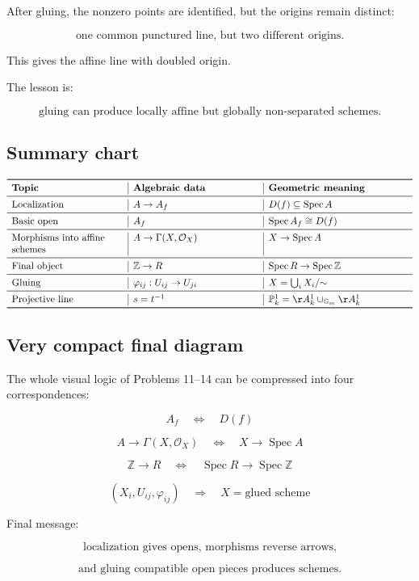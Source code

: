 \documentclass[12pt,a4paper]{article}
\newcommand{\GG}{\mathbb G}
\newcommand{\ZZ}{\mathbb Z}
\newcommand{\PP}{\mathbb P}
\newcommand{\OO}{\mathcal{O}}
\newcommand{\Spec}{\operatorname{Spec}}
\theoremstyle{notespace}
\begin{document}
After gluing, the nonzero points are identified, but the origins remain distinct:

\[
\boxed{
	\text{one common punctured line, but two different origins.}
}
\]

This gives the affine line with doubled origin.

The lesson is:

\[
\boxed{
	\text{gluing can produce locally affine but globally non-separated schemes.}
}
\]

\subsection{Summary chart}

\[
\begin{array}{>{\raggedright\arraybackslash}p{4cm}
		|>{\raggedright\arraybackslash}p{4.5cm}
		|>{\raggedright\arraybackslash}p{5cm}}
	\toprule
	\textbf{Topic}
	&
	\textbf{Algebraic data}
	&
	\textbf{Geometric meaning}
	\\
	\midrule
	Localization
	&
	\(A\to A_f\)
	&
	\(D(f)\subseteq\Spec A\)
	\\
	\midrule
	Basic open
	&
	\(A_f\)
	&
	\(\Spec A_f\cong D(f)\)
	\\
	\midrule
	Morphisms into affine schemes
	&
	\(A\to\Gamma(X,\OO_X)\)
	&
	\(X\to\Spec A\)
	\\
	\midrule
	Final object
	&
	\(\ZZ\to R\)
	&
	\(\Spec R\to\Spec\ZZ\)
	\\
	\midrule
	Gluing
	&
	\(\varphi_{ij}:U_{ij}\to U_{ji}\)
	&
	\(X=\bigcup_i X_i/{\sim}\)
	\\
	\midrule
	Projective line
	&
	\(s=t^{-1}\)
	&
	\(\PP^1_k=\AA^1_k\cup_{\GG_m}\AA^1_k\)
	\\
	\bottomrule
\end{array}
\]

\subsection{Very compact final diagram}

The whole visual logic of Problems 11--14 can be compressed into four correspondences:

\[
\boxed{
	A_f
}
\quad
\Longleftrightarrow
\quad
\boxed{
	D(f)
}
\]

\[
\boxed{
	A\to\Gamma(X,\OO_X)
}
\quad
\Longleftrightarrow
\quad
\boxed{
	X\to\Spec A
}
\]

\[
\boxed{
	\ZZ\to R
}
\quad
\Longleftrightarrow
\quad
\boxed{
	\Spec R\to\Spec\ZZ
}
\]

\[
\boxed{
	(X_i,U_{ij},\varphi_{ij})
}
\quad
\Longrightarrow
\quad
\boxed{
	X=\text{glued scheme}
}
\]

Final message:

\[
\boxed{
	\text{localization gives opens, morphisms reverse arrows,}
}
\]

\[
\boxed{
	\text{and gluing compatible open pieces produces schemes.}
}
\]
\end{document}
